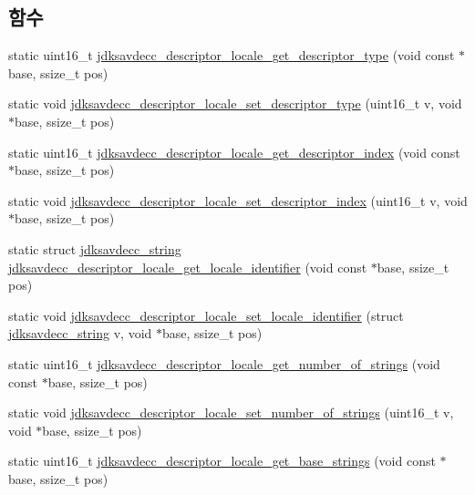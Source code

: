 \subsection*{함수}
\begin{DoxyCompactItemize}
\item 
static uint16\+\_\+t \hyperlink{group__descriptor__locale_ga7b7c3f434a6d9c60990c595f62d5dfa6}{jdksavdecc\+\_\+descriptor\+\_\+locale\+\_\+get\+\_\+descriptor\+\_\+type} (void const $\ast$base, ssize\+\_\+t pos)
\item 
static void \hyperlink{group__descriptor__locale_gafe4a3ffbfdd93ba977602ddc8a749ca2}{jdksavdecc\+\_\+descriptor\+\_\+locale\+\_\+set\+\_\+descriptor\+\_\+type} (uint16\+\_\+t v, void $\ast$base, ssize\+\_\+t pos)
\item 
static uint16\+\_\+t \hyperlink{group__descriptor__locale_gacc9a6ca9fcae307381f586bbd4dae5ae}{jdksavdecc\+\_\+descriptor\+\_\+locale\+\_\+get\+\_\+descriptor\+\_\+index} (void const $\ast$base, ssize\+\_\+t pos)
\item 
static void \hyperlink{group__descriptor__locale_ga0a32fbd7e1e05dcc858353510fdc5824}{jdksavdecc\+\_\+descriptor\+\_\+locale\+\_\+set\+\_\+descriptor\+\_\+index} (uint16\+\_\+t v, void $\ast$base, ssize\+\_\+t pos)
\item 
static struct \hyperlink{structjdksavdecc__string}{jdksavdecc\+\_\+string} \hyperlink{group__descriptor__locale_ga67b321affd857a64eb05f9b37377ff12}{jdksavdecc\+\_\+descriptor\+\_\+locale\+\_\+get\+\_\+locale\+\_\+identifier} (void const $\ast$base, ssize\+\_\+t pos)
\item 
static void \hyperlink{group__descriptor__locale_ga7081f71b7ebc7e06cda7af8ea3ae1bcc}{jdksavdecc\+\_\+descriptor\+\_\+locale\+\_\+set\+\_\+locale\+\_\+identifier} (struct \hyperlink{structjdksavdecc__string}{jdksavdecc\+\_\+string} v, void $\ast$base, ssize\+\_\+t pos)
\item 
static uint16\+\_\+t \hyperlink{group__descriptor__locale_ga6cdf46865c23b52b74d00b39e53b3bf6}{jdksavdecc\+\_\+descriptor\+\_\+locale\+\_\+get\+\_\+number\+\_\+of\+\_\+strings} (void const $\ast$base, ssize\+\_\+t pos)
\item 
static void \hyperlink{group__descriptor__locale_ga353ead3b1f3bc011c18125a1f65a5237}{jdksavdecc\+\_\+descriptor\+\_\+locale\+\_\+set\+\_\+number\+\_\+of\+\_\+strings} (uint16\+\_\+t v, void $\ast$base, ssize\+\_\+t pos)
\item 
static uint16\+\_\+t \hyperlink{group__descriptor__locale_gacf24c87b1d2be33314f3a86687aca010}{jdksavdecc\+\_\+descriptor\+\_\+locale\+\_\+get\+\_\+base\+\_\+strings} (void const $\ast$base, ssize\+\_\+t pos)

\end{DoxyCompactItemize}
